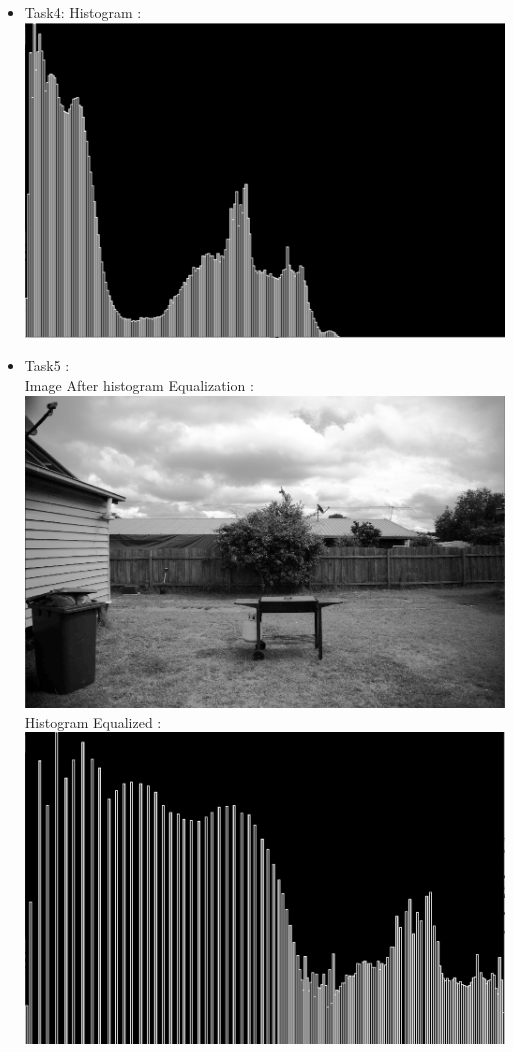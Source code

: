 \documentclass{article}
\begin{document}
\begin{flushleft}
\begin{itemize}
  \item Task4:
  Histogram :
  \includegraphics[scale = 0.35]{images/histogram.png}\\[7\baselineskip]
  \item Task5 : \\
  Image After histogram Equalization :
  \includegraphics[scale = 0.35]{images/image_after_histogram_equalization.png}
  Histogram Equalized :
  \includegraphics[scale = 0.35]{images/histogram_equalized.png}
  \parsep
\end{itemize}

\end{flushleft}
\end{document}
